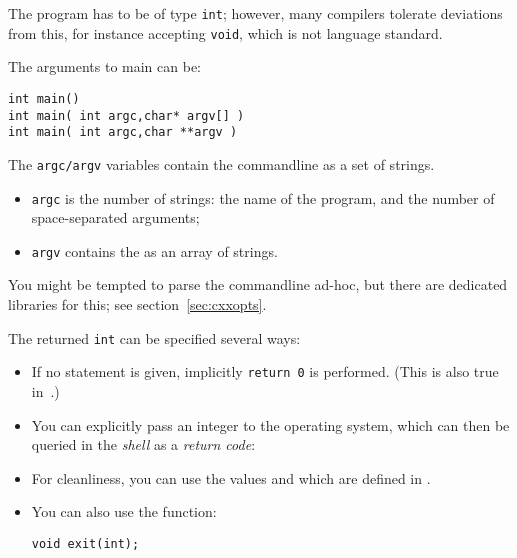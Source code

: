 
\label{sec:int-main}

The  program has to be of type \lstinline{int};
however, many compilers tolerate deviations from this,
for instance accepting \lstinline{void},
which is not language standard.

The arguments to main can be:
\begin{lstlisting}
int main() 
int main( int argc,char* argv[] ) 
int main( int argc,char **argv ) 
\end{lstlisting}

The \lstinline{argc/argv} variables contain the commandline
as a set of strings.
\begin{itemize}
\item \lstinline{argc} is the number of strings: the name of the program,
  and the number of space-separated arguments;
\item \lstinline{argv} contains the 
  as an array of strings.
\end{itemize}
You might be tempted to parse the commandline ad-hoc,
but there are dedicated libraries for this;
see section~\ref{sec:cxxopts}.

The returned \lstinline{int} can be specified several ways:
\begin{itemize}
\item If no  statement is given,
  implicitly \lstinline+return 0+ is performed.
  (This is also true in~.)
\item You can explicitly pass an integer to the operating system,
  which can then be queried in the 
  \emph{shell} as a \emph{return code}:
\item For cleanliness, you can use the values
   and 
  which are defined in .
\item You can also use the  function:
\begin{lstlisting}
void exit(int);
\end{lstlisting}
\end{itemize}

